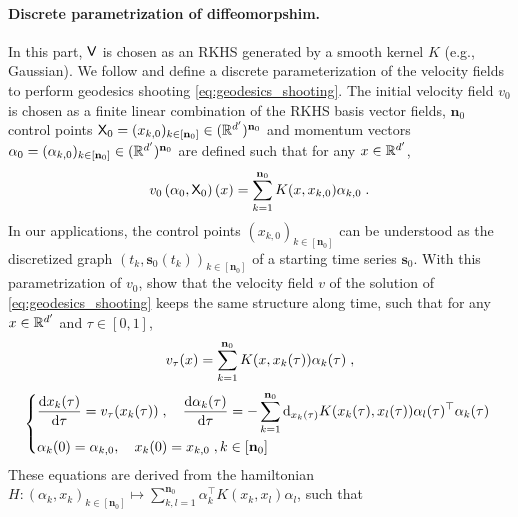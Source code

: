 \paragraph{Discrete parametrization of diffeomorpshim.}

In this part, $\mathsf{V}$ is chosen as an RKHS \cite{berlinet2011reproducing} generated by a smooth kernel $K$ (e.g., Gaussian). 
We follow \cite{durrleman2013sparse} and define a 
 discrete parameterization of the velocity fields to perform geodesics shooting \eqref{eq:geodesics_shooting}.  
  The initial velocity field $v_0$ is chosen as a finite linear combination of the RKHS basis vector fields, 
$\mathbf{n}_0$ control points $\mathsf{X}_0=(x_{k,0})_{k\in[\mathbf{n}_0]}\in (\mathbb{R}^{d'})^{\mathbf{n}_0}$ and momentum vectors $\alpha_0=(\alpha_{k,0})_{k\in[\mathbf{n}_0]}\in (\mathbb{R}^{d'})^{\mathbf{n}_0} $ are defined such that for any $x\in \mathbb{R}^{d'}$, 
  \begin{equation}
    \label{eq:def_v0}
    v_0\left(\alpha_0,\mathsf{X}_0\right)(x)=\sum_{k=1}^{\mathbf{n}_0} K(x,x_{k,0})\alpha_{k,0} \; .
  \end{equation}
   In our applications, the control points $(x_{k,0})_{k\in[\mathbf{n}_0]}$ can be understood as the discretized graph $(t_k,\mathbf{s}_0(t_k))_{k\in[\mathbf{n}_0]}$ of a starting time series $\mathbf{s}_0$. 
  With this parametrization of $v_0$, \citet{miller2006geodesic} show that the velocity field $v$ of the solution of \eqref{eq:geodesics_shooting} keeps the same
  structure along time, such that for any $x\in\mathbb{R}^{d'}$ and $\tau\in[0,1]$, 
  \begin{equation}
    \label{eq:specific_form}
    v_\tau(x)=\sum_{k=1}^{\mathbf{n}_0} K(x,x_k(\tau))\alpha_{k}(\tau) \; ,
  \end{equation}
  \begin{equation} 
    \label{eq:integration}
      \left\{
        \begin{aligned}
        & \frac{\mathop{}\!\mathrm{d} x_k(\tau)}{\mathop{}\!\mathrm{d} \tau}=v_\tau(x_k(\tau)) \;, \quad
        \frac{\mathop{}\!\mathrm{d} \alpha_k(\tau)}{\mathop{}\!\mathrm{d} \tau}=-\sum_{k=1}^{\mathbf{n}_0} \mathop{}\!\mathrm{d}_{x_k(\tau)} K(x_k(\tau),x_l(\tau))\alpha_{l}(\tau)^\top \alpha_{k}(\tau) \;  \\
        & \alpha_k(0)=\alpha_{k,0},\quad x_k(0)=x_{k,0} \; , k\in[\mathbf{n}_0] 
        \end{aligned}
        \right .
  \end{equation}
  These equations are derived from the hamiltonian $H:(\alpha_k,x_k)_{k\in [\mathbf{n}_0]}\mapsto \sum_{k,l=1}^{\mathbf{n}_0} \alpha_{k}^\top K(x_k,x_l)\alpha_{l}  $, such that

